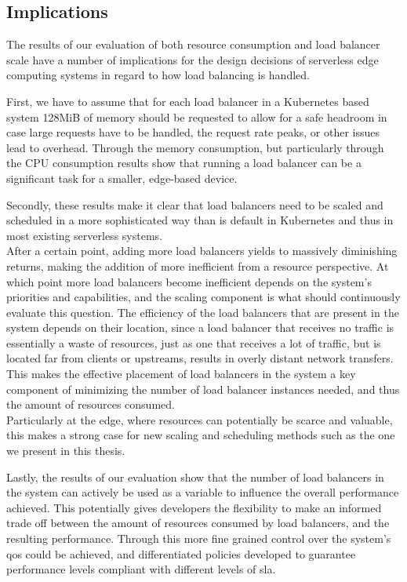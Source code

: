 \documentclass[draft,final]{vutinfth} %
\begin{document}
\subsection{Implications}
The results of our evaluation of both resource consumption and load balancer scale have a number of implications for the design decisions of serverless edge computing systems in regard to how load balancing is handled.

First, we have to assume that for each load balancer in a Kubernetes based system 128MiB of memory should be requested to allow for a safe headroom in case large requests have to be handled, the request rate peaks, or other issues lead to overhead.
Through the memory consumption, but particularly through the CPU consumption results show that running a load balancer can be a significant task for a smaller, edge-based device.

Secondly, these results make it clear that load balancers need to be scaled and scheduled in a more sophisticated way than is default in Kubernetes and thus in most existing serverless systems.\\
After a certain point, adding more load balancers yields to massively diminishing returns, making the addition of more inefficient from a resource perspective.
At which point more load balancers become inefficient depends on the system's priorities and capabilities, and the scaling component is what should continuously evaluate this question.
The efficiency of the load balancers that are present in the system depends on their location, since a load balancer that receives no traffic is essentially a waste of resources, just as one that receives a lot of traffic, but is located far from clients or upstreams, results in overly distant network transfers.
This makes the effective placement of load balancers in the system a key component of minimizing the number of load balancer instances needed, and thus the amount of resources consumed.\\
Particularly at the edge, where resources can potentially be scarce and valuable, this makes a strong case for new scaling and scheduling methods such as the one we present in this thesis.

Lastly, the results of our evaluation show that the number of load balancers in the system can actively be used as a variable to influence the overall performance achieved.
This potentially gives developers the flexibility to make an informed trade off between the amount of resources consumed by load balancers, and the resulting performance.
Through this more fine grained control over the system's \gls{qos} could be achieved, and differentiated policies developed to guarantee performance levels compliant with different levels of \gls{sla}.
\end{document}

